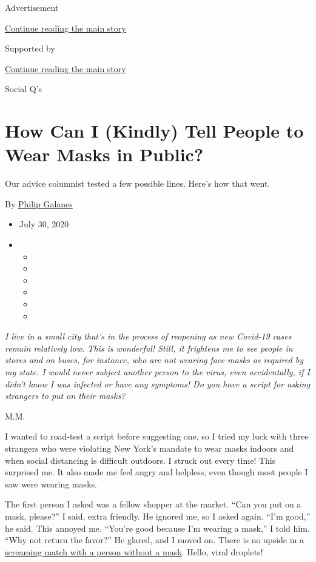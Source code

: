 Advertisement

\protect\hyperlink{after-top}{Continue reading the main story}

Supported by

\protect\hyperlink{after-sponsor}{Continue reading the main story}

Social Q's

\hypertarget{how-can-i-kindly-tell-people-to-wear-masks-in-public}{%
\section{How Can I (Kindly) Tell People to Wear Masks in
Public?}\label{how-can-i-kindly-tell-people-to-wear-masks-in-public}}

Our advice columnist tested a few possible lines. Here's how that went.

By \href{https://www.nytimes3xbfgragh.onion/by/philip-galanes}{Philip
Galanes}

\begin{itemize}
\item
  July 30, 2020
\item
  \begin{itemize}
  \item
  \item
  \item
  \item
  \item
  \item
  \end{itemize}
\end{itemize}

\emph{I live in a small city that's in the process of reopening as new
Covid-19 cases remain relatively low. This is wonderful! Still, it
frightens me to see people in stores and on buses, for instance, who are
not wearing face masks as required by my state. I would never subject
another person to the virus, even accidentally, if I didn't know I was
infected or have any symptoms! Do you have a script for asking strangers
to put on their masks?}

M.M.

I wanted to road-test a script before suggesting one, so I tried my luck
with three strangers who were violating New York's mandate to wear masks
indoors and when social distancing is difficult outdoors. I struck out
every time! This surprised me. It also made me feel angry and helpless,
even though most people I saw were wearing masks.

The first person I asked was a fellow shopper at the market. ``Can you
put on a mask, please?'' I said, extra friendly. He ignored me, so I
asked again. ``I'm good,'' he said. This annoyed me. ``You're good
because I'm wearing a mask,'' I told him. ``Why not return the favor?''
He glared, and I moved on. There is no upside in a
\href{https://www.nytimes3xbfgragh.onion/2020/06/30/style/mask-america-freedom-coronavirus.html}{screaming
match with a person without a mask}. Hello, viral droplets!

